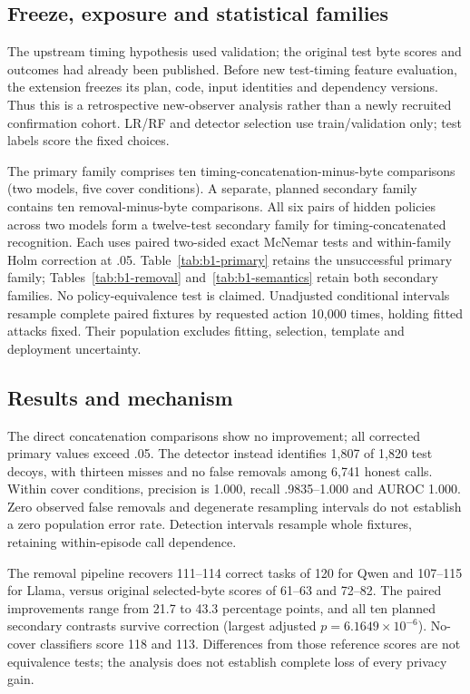 \subsection{Freeze, exposure and statistical families}
The upstream timing hypothesis used validation; the original test byte scores and outcomes had already been published. Before new test-timing feature evaluation, the extension freezes its plan, code, input identities and dependency versions. Thus this is a retrospective new-observer analysis rather than a newly recruited confirmation cohort. LR/RF and detector selection use train/validation only; test labels score the fixed choices.

The primary family comprises ten timing-concatenation-minus-byte comparisons (two models, five cover conditions). A separate, planned secondary family contains ten removal-minus-byte comparisons. All six pairs of hidden policies across two models form a twelve-test secondary family for timing-concatenated recognition. Each uses paired two-sided exact McNemar tests and within-family Holm correction at .05. Table~\ref{tab:b1-primary} retains the unsuccessful primary family; Tables~\ref{tab:b1-removal} and~\ref{tab:b1-semantics} retain both secondary families. No policy-equivalence test is claimed. Unadjusted conditional intervals resample complete paired fixtures by requested action 10,000 times, holding fitted attacks fixed. Their population excludes fitting, selection, template and deployment uncertainty.







\subsection{Results and mechanism}
The direct concatenation comparisons show no improvement; all corrected primary values exceed .05. The detector instead identifies 1,807 of 1,820 test decoys, with thirteen misses and no false removals among 6,741 honest calls. Within cover conditions, precision is 1.000, recall .9835--1.000 and AUROC 1.000. Zero observed false removals and degenerate resampling intervals do not establish a zero population error rate. Detection intervals resample whole fixtures, retaining within-episode call dependence.

The removal pipeline recovers 111--114 correct tasks of 120 for Qwen and 107--115 for Llama, versus original selected-byte scores of 61--63 and 72--82. The paired improvements range from 21.7 to 43.3 percentage points, and all ten planned secondary contrasts survive correction (largest adjusted $p=6.1649\times10^{-6}$). No-cover classifiers score 118 and 113. Differences from those reference scores are not equivalence tests; the analysis does not establish complete loss of every privacy gain.

